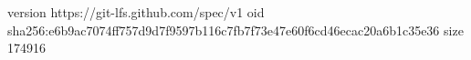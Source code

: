 version https://git-lfs.github.com/spec/v1
oid sha256:e6b9ac7074ff757d9d7f9597b116c7fb7f73e47e60f6cd46ecac20a6b1c35e36
size 174916
